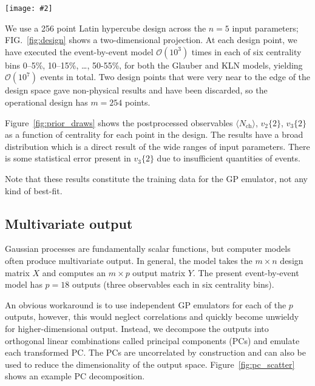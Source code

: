 \documentclass[aps,prc,reprint,superscriptaddress,amsmath]{revtex4-1}
\newcommand{\widefig}[3][t]{
  \begin{figure*}[#1]
    \texttt{[image: \#2]}
    \caption{\label{fig:#2}#3}
  \end{figure*}
}
\newcommand{\avg}[1]{\langle #1 \rangle}
\newcommand{\nch}{N_\text{ch}}
\newcommand{\vnk}[2]{v_#1\{#2\}}
\newcommand{\order}[1]{$\mathcal O(10^{#1})$}
\begin{document}
\widefig{prior_draws}{
  Model calculations from Glauber (top, blue) and KLN (bottom, green) initial conditions.
  Each plot has 254 lines corresponding to the 254 Latin hypercube design points.
  From left to right:
  average charged-particle multiplicity $\avg\nch$,
  elliptic flow two-particle cumulant $\vnk 2 2$,
  and triangular flow two-particle cumulant $\vnk 3 2$.
  Data points are experimental measurements from ALICE \cite{Abelev:2014mda}.
}

We use a 256 point Latin hypercube design across the $n = 5$ input parameters; FIG.~\ref{fig:design} shows a two-dimensional projection.
At each design point, we have executed the event-by-event model \order 3 times in each of six centrality bins 0--5\%, 10--15\%, \ldots, 50-55\%, for both the Glauber and KLN models, yielding \order 7 events in total.
Two design points that were very near to the edge of the design space gave non-physical results and have been discarded, so the operational design has $m = 254$ points.

Figure~\ref{fig:prior_draws} shows the postprocessed observables $\avg\nch$, $\vnk 2 2$, $\vnk 3 2$ as a function of centrality for each point in the design.
The results have a broad distribution which is a direct result of the wide ranges of input parameters.
There is some statistical error present in $\vnk 3 2$ due to insufficient quantities of events.

Note that these results constitute the training data for the GP emulator, not any kind of best-fit.

\subsection{Multivariate output}

Gaussian processes are fundamentally scalar functions, but computer models often produce multivariate output.
In general, the model takes the $m \times n$ design matrix $X$ and computes an $m \times p$ output matrix $Y$.
The present event-by-event model has $p = 18$ outputs (three observables each in six centrality bins).

An obvious workaround is to use independent GP emulators for each of the $p$ outputs, however, this would neglect correlations and quickly become unwieldy for higher-dimensional output.
Instead, we decompose the outputs into orthogonal linear combinations called principal components (PCs) and emulate each transformed PC.
The PCs are uncorrelated by construction and can also be used to reduce the dimensionality of the output space.
Figure~\ref{fig:pc_scatter} shows an example PC decomposition.
\end{document}
